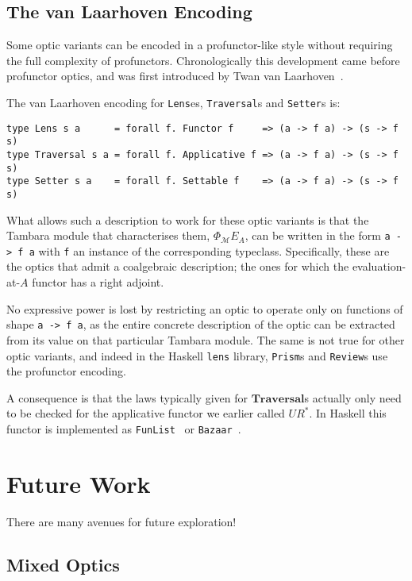 \documentclass[11pt,letterpaper]{article}
\theoremstyle{plain}
\theoremstyle{definition}
\newcommand{\M}{\mathscr{M}}
\newcommand{\lenslib}{\texttt{lens}}
\newcommand{\Pastro}{\Phi}
\newcommand{\Traversal}{\mathbf{Traversal}}
\begin{document}
\subsection{The van Laarhoven Encoding}\label{sec:van-laarhoven}

Some optic variants can be encoded in a profunctor-like style without requiring the full complexity of profunctors. Chronologically this development came before profunctor optics, and was first introduced by Twan van Laarhoven~\cite{VanLaarhovenPost}.

The van Laarhoven encoding for \texttt{Lens}es, \texttt{Traversal}s and \texttt{Setter}s is:
\begin{verbatim}
type Lens s a      = forall f. Functor f     => (a -> f a) -> (s -> f s)
type Traversal s a = forall f. Applicative f => (a -> f a) -> (s -> f s)
type Setter s a    = forall f. Settable f    => (a -> f a) -> (s -> f s)
\end{verbatim}
What allows such a description to work for these optic variants is that the Tambara module that characterises them, $\Pastro_\M E_A$, can be written in the form \texttt{a -> f a} with \texttt{f} an instance of the corresponding typeclass. Specifically, these are the optics that admit a coalgebraic description; the ones for which the evaluation-at-$A$ functor has a right adjoint.

No expressive power is lost by restricting an optic to operate only on functions of shape \texttt{a -> f a}, as the entire concrete description of the optic can be extracted from its value on that particular Tambara module. The same is not true for other optic variants, and indeed in the Haskell \lenslib{} library, \texttt{Prism}s and \texttt{Review}s use the profunctor encoding.

A consequence is that the laws typically given for $\Traversal$s actually only need to be checked for the applicative functor we earlier called $UR^*$. In Haskell this functor is implemented as \texttt{FunList}~\cite{FunListPost} or \texttt{Bazaar}~\cite{LensLibrary}.

\section{Future Work}

There are many avenues for future exploration!

\subsection{Mixed Optics}
\end{document}
